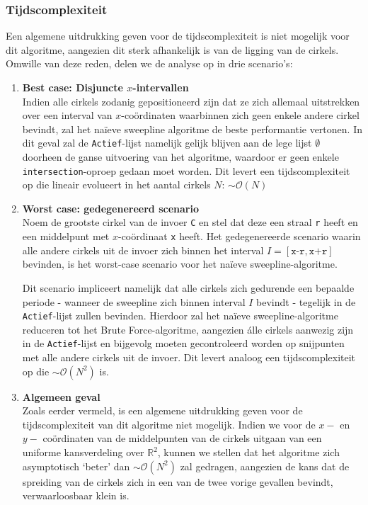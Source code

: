 \documentclass[12pt]{article}
\begin{document}
\subsubsection{Tijdscomplexiteit}
Een algemene uitdrukking geven voor de tijdscomplexiteit is niet mogelijk voor dit algoritme, aangezien dit sterk afhankelijk is van de ligging van de cirkels. Omwille van deze reden, delen we de analyse op in drie scenario's:
\begin{enumerate}
	\item \textbf{Best case: Disjuncte $ x $-intervallen}\\
		Indien alle cirkels zodanig gepositioneerd zijn dat ze zich allemaal uitstrekken over een interval van $ x $-coördinaten waarbinnen zich geen enkele andere cirkel bevindt, zal het naïeve sweepline algoritme de beste performantie vertonen. In dit geval zal de \texttt{Actief}-lijst namelijk gelijk blijven aan de lege lijst $\emptyset$ doorheen de ganse uitvoering van het algoritme, waardoor er geen enkele \texttt{intersection}-oproep gedaan moet worden. Dit levert een tijdscomplexiteit op die lineair evolueert in het aantal cirkels $ N $: $ \sim \mathcal{O}(N) $  
	\item \textbf{Worst case: gedegenereerd scenario}\\
		Noem de grootste cirkel van de invoer \texttt{C} en stel dat deze een straal \texttt{r} heeft en een middelpunt met $ x $-coördinaat \texttt{x} heeft. Het gedegenereerde scenario waarin alle andere cirkels uit de invoer zich binnen het interval $I = \left[\texttt{x-r}, \texttt{x+r}\right] $ bevinden, is het worst-case scenario voor het naïeve sweepline-algoritme.
		
		 Dit scenario impliceert namelijk dat alle cirkels zich gedurende een bepaalde periode - wanneer de sweepline zich binnen interval $ I $ bevindt - tegelijk in de \texttt{Actief}-lijst zullen bevinden. Hierdoor zal het naïeve sweepline-algoritme reduceren tot het Brute Force-algoritme, aangezien álle cirkels aanwezig zijn in de \texttt{Actief}-lijst en bijgevolg moeten gecontroleerd worden op snijpunten met alle andere cirkels uit de invoer. Dit levert analoog een tijdscomplexiteit op die $ \sim \mathcal{O}(N^2) $ is.
 \item \textbf{Algemeen geval}\\%
 		Zoals eerder vermeld, is een algemene uitdrukking geven voor de tijdscomplexiteit van dit algoritme niet mogelijk. Indien we voor de $ x- $ en $ y- $ coördinaten van de middelpunten van de cirkels uitgaan van een uniforme kansverdeling over $ \mathbb{R}^2 $, kunnen we stellen dat het algoritme zich asymptotisch `beter' dan $ \sim \mathcal{O}(N^2) $ zal gedragen, aangezien de kans dat de spreiding van de cirkels zich in een van de twee vorige gevallen bevindt, verwaarloosbaar klein is.
\end{enumerate}
\end{document}
